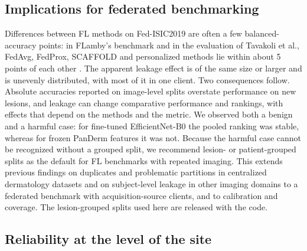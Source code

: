 \documentclass[VANCOUVER,Times1COL]{WileyNJDv5}
\begin{document}
\subsection{Implications for federated benchmarking}

Differences between FL methods on Fed-ISIC2019 are often a few balanced-accuracy points: in FLamby's
benchmark and in the evaluation of Tavakoli et al., FedAvg, FedProx, SCAFFOLD and personalized methods lie
within about 5 points of each other \cite{flamby2022,tavakoli2024fendafl}. The apparent leakage effect is
of the same size or larger and is unevenly distributed, with most of it in one client. Two consequences
follow. Absolute accuracies reported on image-level splits overstate performance on new lesions, and
leakage can change comparative performance and rankings, with effects that depend on the methods and the
metric. We observed both a benign and a harmful case: for fine-tuned EfficientNet-B0 the pooled ranking was
stable, whereas for frozen PanDerm features it was not. Because the harmful case cannot be recognized
without a grouped split, we recommend lesion- or patient-grouped splits as the default for FL benchmarks
with repeated imaging. This extends previous findings on duplicates and problematic partitions in
centralized dermatology datasets \cite{cassidy2022isic,groger2023reliable,abhishek2025dermamnist} and on
subject-level leakage in other imaging domains \cite{bussola2021tiles,yagis2021leakage} to a federated
benchmark with acquisition-source clients, and to calibration and coverage. The lesion-grouped splits used
here are released with the code.

\subsection{Reliability at the level of the site}
\end{document}

